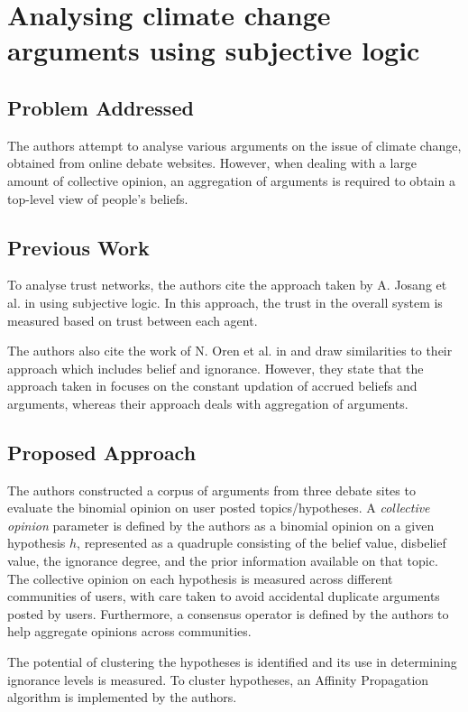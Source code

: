 \documentclass[UTF8]{article}
\begin{document}
\section{Analysing climate change arguments using subjective logic}
\subsection{Problem Addressed}
The authors attempt to analyse various arguments on the issue of climate change, obtained from online debate websites. However, when dealing with a large amount of 
collective opinion, an aggregation of arguments is required to obtain a top-level view of people's beliefs.
\subsection{Previous Work}
To analyse trust networks, the authors cite the approach taken by A. Josang et al. in \cite{Jsang2006TrustNA} using subjective logic. In this approach, the trust in the overall system 
is measured based on trust between each agent.

The authors also cite the work of N. Oren et al. in \cite{OREN2007838} and draw similarities to their approach which includes belief and ignorance. However, they state that the approach taken in 
\cite{OREN2007838} focuses on the constant updation of accrued beliefs and arguments, whereas their approach deals with aggregation of arguments.

\subsection{Proposed Approach}
The authors constructed a corpus of arguments from three debate sites to evaluate the binomial opinion on user posted topics/hypotheses. A \textit{collective opinion} 
parameter is defined by the authors as a binomial opinion on a given hypothesis $h$, represented as a quadruple consisting of the belief value, disbelief value,  the ignorance degree, 
and the prior information available on that topic. The collective opinion on each hypothesis is measured across different communities of users, with care taken to avoid accidental duplicate 
arguments posted by users. Furthermore, a consensus operator is defined by the authors to help aggregate opinions across communities.

The potential of clustering the hypotheses is identified and its use in determining ignorance levels is measured. To cluster hypotheses, an Affinity Propagation algorithm \cite{Frey972} is implemented by the authors.
\end{document}
